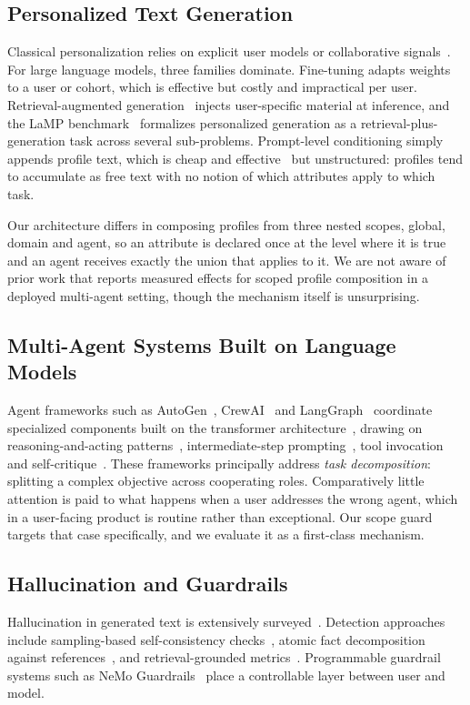 \documentclass[9pt,twocolumn]{extarticle}
\begin{document}
\subsection{Personalized Text Generation}
Classical personalization relies on explicit user models or collaborative
signals~\cite{koren2009matrix, zhang2020explainable}. For large language
models, three families dominate. Fine-tuning adapts weights to a user or
cohort, which is effective but costly and impractical per user.
Retrieval-augmented generation~\cite{lewis2020rag} injects user-specific
material at inference, and the LaMP benchmark~\cite{salemi2023lamp} formalizes
personalized generation as a retrieval-plus-generation task across several
sub-problems. Prompt-level conditioning simply appends profile text, which is
cheap and effective~\cite{brown2020fewshot} but unstructured: profiles tend to
accumulate as free text with no notion of which attributes apply to which task.

Our architecture differs in composing profiles from three nested scopes, global,
domain and agent, so an attribute is declared once at the level where it is
true and an agent receives exactly the union that applies to it. We are not
aware of prior work that reports measured effects for scoped profile
composition in a deployed multi-agent setting, though the mechanism itself is
unsurprising.

\subsection{Multi-Agent Systems Built on Language Models}
Agent frameworks such as AutoGen~\cite{wu2023autogen},
CrewAI~\cite{moura2024crewai} and LangGraph~\cite{langgraph2024} coordinate
specialized components built on the transformer
architecture~\cite{vaswani2017attention}, drawing on reasoning-and-acting
patterns~\cite{yao2023react}, intermediate-step prompting~\cite{wei2022cot},
tool invocation~\cite{schick2023toolformer} and
self-critique~\cite{shinn2023reflexion}. These frameworks principally address
\textit{task decomposition}: splitting a complex objective across cooperating
roles. Comparatively little attention is paid to what happens when a user
addresses the wrong agent, which in a user-facing product is routine rather
than exceptional. Our scope guard targets that case specifically, and we
evaluate it as a first-class mechanism.

\subsection{Hallucination and Guardrails}
Hallucination in generated text is extensively
surveyed~\cite{ji2023hallucination}. Detection approaches include
sampling-based self-consistency checks~\cite{manakul2023selfcheckgpt}, atomic
fact decomposition against references~\cite{min2023factscore}, and
retrieval-grounded metrics~\cite{es2024ragas}. Programmable guardrail systems
such as NeMo Guardrails~\cite{rebedea2023nemo} place a controllable layer
between user and model.
\end{document}
